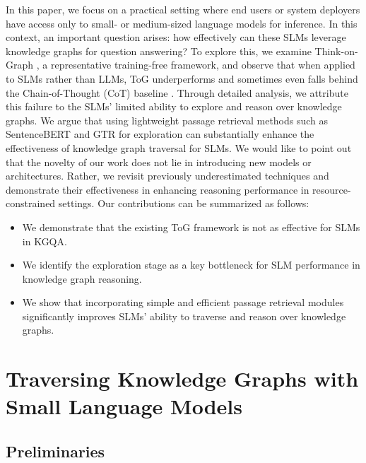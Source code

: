 \documentclass[11pt]{article}
\begin{document}
In this paper, we focus on a practical setting where end users or system deployers have access only to small- or medium-sized language models for inference. In this context, an important question arises: how effectively can these SLMs leverage knowledge graphs for question answering? To explore this, we examine Think-on-Graph \cite{sun2024thinkongraph}, a representative training-free framework, and observe that when applied to SLMs rather than LLMs, ToG underperforms and sometimes even falls behind the Chain-of-Thought (CoT) baseline \cite{wei2022chain}. Through detailed analysis, we attribute this failure to the SLMs' limited ability to explore and reason over knowledge graphs. %
We argue that using lightweight passage retrieval methods such as SentenceBERT and GTR for exploration can substantially enhance the effectiveness of knowledge graph traversal for SLMs. We would like to point out that the novelty of our work does not lie in introducing new models or architectures. Rather, we revisit previously underestimated techniques and demonstrate their effectiveness in enhancing reasoning performance in resource-constrained settings. Our contributions can be summarized as follows:
\begin{itemize}
    \item We demonstrate that the existing ToG framework is not as effective for SLMs in KGQA.
    \item We identify the exploration stage as a key bottleneck for SLM performance in knowledge graph reasoning.
    \item We show that incorporating simple and efficient passage retrieval modules significantly improves SLMs' ability to traverse and reason over knowledge graphs.

\end{itemize}

\section{Traversing Knowledge Graphs with Small Language Models}
\subsection{Preliminaries}
\end{document}
